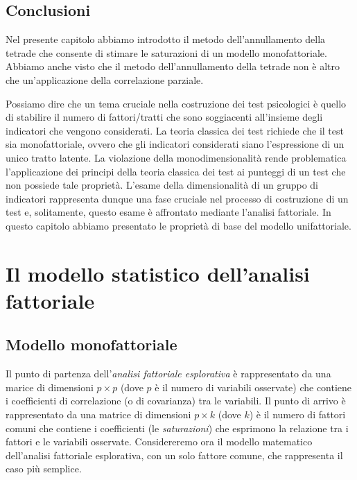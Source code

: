 \documentclass[
  11pt,
]{krantz}
\theoremstyle{definition}
\theoremstyle{definition}
\theoremstyle{definition}
\theoremstyle{definition}
\theoremstyle{remark}
\begin{document}
\hypertarget{conclusioni}{%
\section*{Conclusioni}\label{conclusioni}}


Nel presente capitolo abbiamo introdotto il metodo dell'annullamento della tetrade che consente di stimare le saturazioni di un modello monofattoriale. Abbiamo anche visto che il metodo dell'annullamento della tetrade non è altro che un'applicazione della correlazione parziale.

Possiamo dire che un tema cruciale nella costruzione dei test psicologici è quello di stabilire il numero di fattori/tratti che sono soggiacenti all'insieme degli indicatori che vengono considerati. La teoria classica dei test richiede che il test sia monofattoriale, ovvero che gli indicatori considerati siano l'espressione di un unico tratto latente. La violazione della monodimensionalità rende problematica l'applicazione dei principi della teoria classica dei test ai punteggi di un test che non possiede tale proprietà. L'esame della dimensionalità di un gruppo di indicatori rappresenta dunque una fase cruciale nel processo di costruzione di un test e, solitamente, questo esame è affrontato mediante l'analisi fattoriale. In questo capitolo abbiamo presentato le proprietà di base del modello unifattoriale.

\hypertarget{ch:mod_unifattoriale}{%
\chapter{Il modello statistico dell'analisi fattoriale}\label{ch:mod_unifattoriale}}

\hypertarget{modello-monofattoriale-1}{%
\section{Modello monofattoriale}\label{modello-monofattoriale-1}}

Il punto di partenza dell'\emph{analisi fattoriale esplorativa} è rappresentato da una marice di dimensioni \(p \times p\) (dove \(p\) è il numero di variabili osservate) che contiene i coefficienti di correlazione (o di covarianza) tra le variabili. Il punto di arrivo è rappresentato da una matrice di dimensioni \(p \times k\) (dove \(k\)) è il numero di fattori comuni che contiene i coefficienti (le \emph{saturazioni}) che esprimono la relazione tra i fattori e le variabili osservate. Considereremo ora il modello matematico dell'analisi fattoriale esplorativa, con un solo fattore comune, che rappresenta il caso più semplice.
\end{document}

